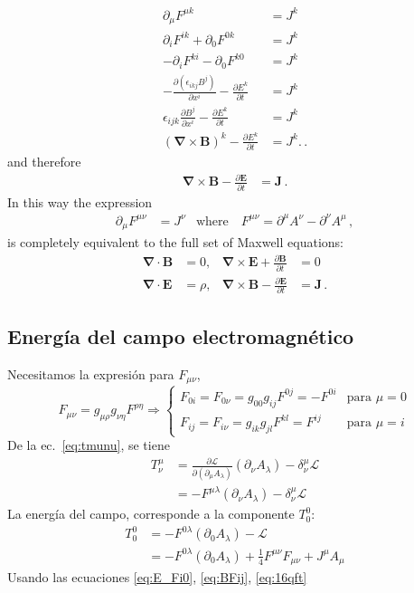 \begin{align}
\partial_\mu F^{\mu k}&=J^k\nonumber\\
\partial_iF^{ik}+\partial_0F^{0k}&=J^k\nonumber\\
-\partial_iF^{ki}-\partial_0F^{k0}&=J^k\nonumber\\
  -\frac{\partial (\epsilon_{ikj}B^j)}{\partial x^{i}}-\frac{\partial E^k}{\partial t}&=J^k\nonumber\\
\epsilon_{ijk}\frac{\partial B^j}{\partial x^{i}}-\frac{\partial E^k}{\partial t}&=J^k\nonumber\\
(\boldsymbol{\nabla}\times \mathbf{B})^k-\frac{\partial E^k}{\partial t}&=J^k.\,.
\end{align}
and therefore
\begin{align}
  \boldsymbol{\nabla}\times \mathbf{B}-\frac{\partial\mathbf{E}}{\partial t}&=\mathbf{J}\,.
\end{align}
In this way the expression
\begin{align}
   \partial_\mu F^{\mu\nu}&=J^\nu& \text{where}\quad    F^{\mu\nu}=\partial^\mu A^\nu-\partial^\nu A^\mu\,,
\end{align}
is completely equivalent to the full set of Maxwell equations:
\begin{align}
  \label{eq:hom_m_eq}
  \boldsymbol{\nabla}\cdot\mathbf{B}&=0,&\boldsymbol{\nabla}\times \mathbf{E}+\frac{\partial\mathbf{B}}{\partial t}&=0\\
  \label{eq:inhom_m_eq}
  \boldsymbol{\nabla}\cdot\mathbf{E}&=\rho,&\boldsymbol{\nabla}\times \mathbf{B}-\frac{\partial\mathbf{E}}{\partial t}&=\mathbf{J}\,.
\end{align}

\subsection{Energía del campo electromagnético}
Necesitamos la expresión para $F_{\mu\nu}$,
\begin{equation}
  \label{eq:16qft}
  F_{\mu\nu}=g_{\mu\rho}g_{\nu\eta}F^{\rho\eta}\Rightarrow
  \begin{cases}
    F_{0i}=F_{0\nu}=g_{00}g_{ij}F^{0j}=-F^{0i} &\text{para $\mu=0$}\\
    F_{ij}=F_{i\nu}=g_{ik}g_{jl}F^{kl}=F^{ij} &\text{para $\mu=i$}
  \end{cases}
\end{equation}
De la ec.~\eqref{eq:tmunu}, se tiene
\begin{align}
  T^\mu_\nu&=\frac{\partial\mathcal{L}}{\partial(\partial_\mu A_\lambda)}(\partial_\nu A_\lambda)
  -\delta^\mu_\nu\mathcal{L}\nonumber\\
  &=-F^{\mu\lambda}(\partial_\nu A_\lambda)-\delta^\mu_\nu\mathcal{L}
\end{align}
La energía del campo, corresponde a la componente $T^0_0$:
\begin{align}
\label{eq:17qft}
  T^0_0&=-F^{0\lambda}(\partial_0A_\lambda)-\mathcal{L}\nonumber\\
  &=-F^{0\lambda}(\partial_0A_\lambda)+\frac{1}{4}F^{\mu\nu}F_{\mu\nu}+J^\mu A_\mu\nonumber
\end{align}
Usando las ecuaciones 
\eqref{eq:E_Fi0}, %
\eqref{eq:BFij}, \eqref{eq:16qft}

